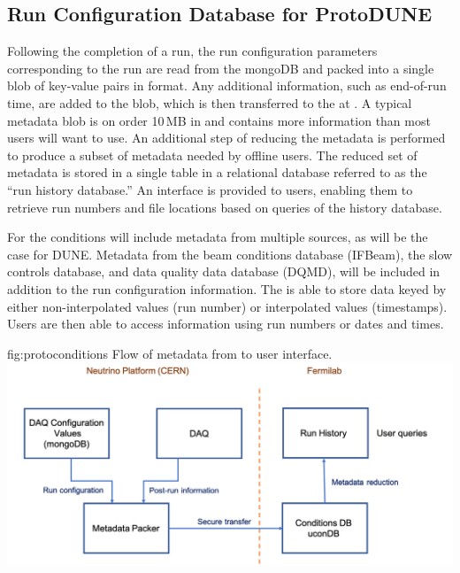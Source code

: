\documentclass[../main-v1.tex]{subfiles}
\begin{document}
\subsection{Run Configuration Database for ProtoDUNE}
\label{sec:runconfigPD}

 Following the completion of a run, the run configuration parameters corresponding to the run are read from the mongoDB and packed into a single %
 blob of key-value pairs in  format. Any additional information, such as end-of-run time, are added to the blob, which is then transferred to the  at . A typical metadata blob is on order 10\,MB in and contains more information than most users will want to use. An additional step of reducing the metadata is performed to produce a subset of metadata needed by offline users. The reduced set of metadata is stored in a single table in a relational database referred to as the ``run history database.'' An interface is provided to users, enabling them to retrieve run numbers and file locations based on queries of the history database. 

For %
 the conditions  will include metadata from multiple sources, as will be the case for DUNE. Metadata from the beam conditions database (IFBeam), the slow controls database, and data quality data database (DQMD),
 will be included in addition to the run configuration information. The  is able to store data keyed by either non-interpolated values (run number) or interpolated values (timestamps). Users are then able to access information using run numbers or dates and times.


\begin{dunefigure}
{fig:protoconditions} 
{Flow of metadata from   to user interface.}
\includegraphics[width=.9\columnwidth]{graphics/Databases/Conditions_ProtoDUNE.png}
\end{dunefigure}
\end{document}
